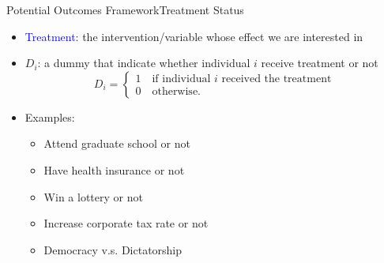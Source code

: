 \documentclass[hyperref={pdfpagelabels=false}]{beamer}
\begin{document}
\begin{frame}{Potential Outcomes Framework}{Treatment Status}
\begin{itemize} 

\item \textcolor{blue}{Treatment}: the intervention/variable whose effect we are interested in
\vspace{0.2cm}		
\item $D_i$: a dummy that indicate whether individual $i$ receive treatment or not
\begin{equation*}
D_i=\left\lbrace
\begin{array}{l}
1\quad \text{if individual $i$ received the treatment} \\
0\quad \text{otherwise.}
\end{array} \right.
\end{equation*}
\item Examples:
\vspace{0.2cm}
\begin{itemize}
\item Attend graduate school or not
\vspace{0.2cm}
\item Have health insurance or not
\vspace{0.2cm}
\item Win a lottery or not
\vspace{0.2cm}
\item Increase corporate tax rate or not
\vspace{0.2cm}
\item Democracy v.s. Dictatorship
\end{itemize}

\end{itemize}
\end{frame}
\end{document}
